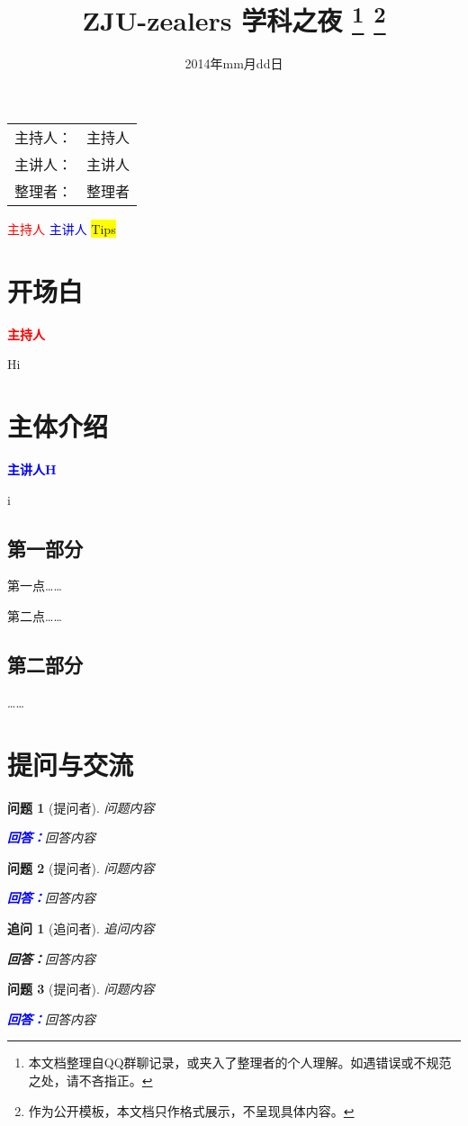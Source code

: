 \documentclass[a4paper,12pt]{ctexart}
\title{\textbf{ZJU-zealers 学科之夜}%
	\footnote{本文档整理自QQ群聊记录，或夹入了整理者的个人理解。如遇错误或不规范之处，请不吝指正。}
	\footnote{作为公开模板，本文档只作格式展示，不呈现具体内容。}
}
\author{}
\date{2014年mm月dd日}
\theoremstyle{Question}
\newtheorem{question}{\color{magenta}问题}
\theoremstyle{postQuestion}
\newtheorem*{postquestion}{\color{magenta!50}追问}
\newcommand{\answer}{\par\noindent\textbf{\textcolor{blue}{回答：}}\normalfont\songti}
\newcommand{\postanswer}{\par\textbf{\textcolor{blue!50}{回答：}}\rmfamily\songti}
\newcommand\host[1][主持人]{\textcolor{red}{\bf#1}\par}
\newcommand\lecturer[2][主讲人]{\textcolor{blue}{\bf#1\quad#2}\par}
\newcommand{\info}[3]{\begin{table}[h]
  \centering
  \begin{tabu}{>{\heiti}X[2,r]>{\kaishu}X[3]}
  	主持人： & #1  \\
  	主讲人： & #2  \\
  	整理者： & #3
  \end{tabu}
\end{table}
}
\begin{document}
\maketitle
\info{主持人} %
	 {主讲人} %
	 {整理者} %
	 
\begin{center}
	\textcolor{red}{主持人} \quad \textcolor{blue}{主讲人} \quad \colorbox{yellow}{Tips}
\end{center}

\tableofcontents

\section{开场白}
\host
Hi

\section{主体介绍}
\lecturer
Hi

\subsection{第一部分}
第一点……

第二点……

\subsection{第二部分}
……


\section{提问与交流}
\begin{question}[提问者]
  问题内容
  
  \answer  回答内容
\end{question}

\begin{question}[提问者]
  问题内容
  
  \answer  回答内容
\end{question}

\begin{postquestion}[追问者]
  追问内容
  
  \postanswer 回答内容
\end{postquestion}

\begin{question}[提问者]
  问题内容
  
  \answer  回答内容
\end{question}
\end{document}
